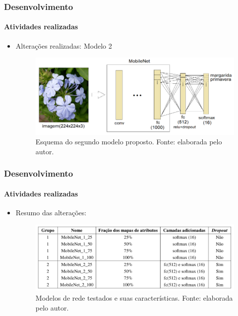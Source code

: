 \documentclass{beamer}
\begin{document}
    \begin{frame}[t]
      \frametitle{Desenvolvimento}
      \framesubtitle{Atividades realizadas}      
      \begin{itemize}
        \item<1-> Alterações realizadas: Modelo 2
        		 \begin{figure}[hbt]
      		 	\begin{center}
      				\includegraphics[height=0.35\textwidth]{img/model2.png}
      			\end{center}
      			    \caption{Esquema do segundo modelo proposto. Fonte: elaborada pelo autor.}
      		\end{figure}
      \end{itemize}
    \end{frame}
    
    \begin{frame}[t]
      \frametitle{Desenvolvimento}
      \framesubtitle{Atividades realizadas}      
      \begin{itemize}
        \item<1-> Resumo das alterações: \medskip
        \begin{figure}[hbt]
      		 	\begin{center}
      				\includegraphics[height=.3 \textwidth]{img/models_table.png}
      			\end{center}
      			\caption{Modelos de rede testados e suas características. Fonte: elaborada pelo autor.}
      		\end{figure}
      \end{itemize}
    \end{frame}
    
\end{document}
